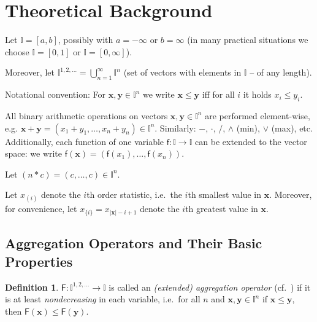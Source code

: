 \documentclass[11pt]{article}\usepackage{graphicx, color}
\renewcommand{\emph}[1]{\textsl{#1}}
\newcommand{\vect}[1]{{\mathbf{#1}}}
\newcommand{\func}[1]{{\mathsf{#1}}}
\newcommand{\Ival}{\mathbb{I}}
\newcommand{\IvalPow}[1]{\mathbb{I}^{#1}}
\newcommand{\AnyPow}{^{1,2,\dots}}
\newcommand{\IvalAnyPow}{\mathbb{I}\AnyPow}
\theoremstyle{remark}
\theoremstyle{definition}
\newtheorem{definition}[theorem]{Definition}
\begin{document}




\section{Theoretical Background}

Let $\Ival=[a,b]$, possibly with $a=-\infty$ or $b=\infty$
(in many practical situations we choose $\Ival=[0,1]$ or $\Ival=[0,\infty]$).

Moreover, let $\IvalAnyPow=\bigcup_{n=1}^\infty \IvalPow{n}$ (set
of vectors with elements in $\Ival$ -- of any length).

Notational convention:
For $\vect{x},\vect{y}\in\IvalPow{n}$
we write $\vect{x}\le\vect{y}$ iff for all $i$ it holds $x_i\le y_i$.

All binary arithmetic operations on vectors $\vect{x},\vect{y}\in\IvalPow{n}$
are performed element-wise,
e.g. $\vect{x}+\vect{y}=(x_1+y_1,\dots,x_n+y_n)\in\IvalPow{n}$.
Similarly: $-$, $\cdot$, $/$, $\wedge$ (min), $\vee$ (max), etc.
Additionally, each function of one variable
$\func{f}:\Ival\to\Ival$ can be extended to the vector
space: we write $\func{f}(\vect{x})=(\func{f}(x_1), \dots, \func{f}(x_n))$.

Let $(n\ast c) = (c,\dots,c)\in\IvalPow{n}$.

Let $x_{(i)}$ denote the $i$th order statistic,
i.e.~the $i$th smallest value in $\vect{x}$.
Moreover, for convenience,
let $x_{\{i\}}=x_{|\vect{x}|-i+1}$ denote the $i$th greatest value in $\vect{x}$.




\subsection{Aggregation Operators and Their Basic Properties}

\begin{definition}
$\func{F}: \IvalAnyPow\to\Ival$ is called an \emph{(extended) aggregation operator}
(cf.~\cite{GrabischETAL2009:aggregationfunctions})
if it is at least \emph{nondecreasing} in each variable,
i.e.~for all $n$ and $\vect{x},\vect{y}\in\IvalPow{n}$
if $\vect{x}\le\vect{y}$, then $\func{F}(\vect{x})\le\func{F}(\vect{y})$.
\end{definition}
\end{document}
